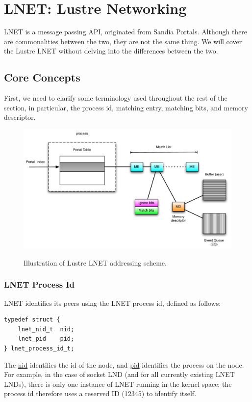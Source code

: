 \section{LNET: Lustre Networking}
\label{sec:lnet}

LNET is a message passing API, originated from Sandia Portals.  Although there
are commonalities between the two, they are not the same thing. We will cover the
Lustre LNET without delving into the differences between the two. 

\subsection{Core Concepts}

First, we need to clarify some terminology used throughout the rest of the
section, in particular, the process id, matching entry, matching bits, and
memory descriptor.

\begin{figure}[htb]
\centering
\includegraphics[width=5in]{img/lustre_portal_address}
\label{fig:lustre_portal_address}
\caption{Illustration of Lustre LNET addressing scheme.}
\end{figure}

\subsubsection*{LNET Process Id}

LNET identifies its peers using the LNET process id, defined as follows:

\begin{Verbatim}
typedef struct {
    lnet_nid_t  nid;
    lnet_pid    pid;
} lnet_process_id_t;
\end{Verbatim}

The \url{nid} identifies the id of the node, and \url{pid} identifies
the process on the node. For example, in the case of socket LND (and
for all currently existing LNET LNDs), there is only one instance of LNET
running in the kernel space; the process id therefore uses a reserved ID
(12345) to identify itself.

